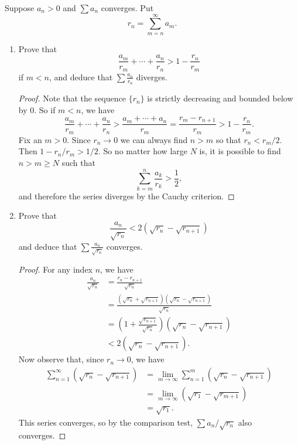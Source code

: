  Suppose $a_n > 0$ and $\sum a_n$ converges. Put
\begin{equation*}
  r_n = \sum_{m=n}^\infty a_m.
\end{equation*}
\begin{enumerate}
\item Prove that
  \begin{equation*}
    \frac{a_m}{r_m} + \cdots + \frac{a_n}{r_n} > 1 - \frac{r_n}{r_m}
  \end{equation*}
  if $m < n$, and deduce that $\sum\frac{a_n}{r_n}$ diverges.
  \begin{proof}
    Note that the sequence $\{r_n\}$ is strictly decreasing and
    bounded below by $0$. So if $m < n$, we have
    \begin{equation*}
      \frac{a_m}{r_m} + \cdots + \frac{a_n}{r_n}
      > \frac{a_m + \cdots + a_n}{r_m}
      = \frac{r_m - r_{n+1}}{r_m} > 1 - \frac{r_n}{r_m}.
    \end{equation*}
    Fix an $m > 0$. Since $r_n\to0$ we can always find $n > m$ so that
    $r_n < r_m/2$. Then $1 - r_n/r_m > 1/2$. So no matter how large
    $N$ is, it is possible to find $n>m\geq N$ such that
    \begin{equation*}
      \sum_{k=m}^n\frac{a_k}{r_k} > \frac12,
    \end{equation*}
    and therefore the series diverges by the Cauchy criterion.
  \end{proof}
\item Prove that
  \begin{equation*}
    \frac{a_n}{\sqrt{r_n}} < 2(\sqrt{r_n} - \sqrt{r_{n+1}})
  \end{equation*}
  and deduce that $\sum\frac{a_n}{\sqrt{r_n}}$ converges.
  \begin{proof}
    For any index $n$, we have
    \begin{align*}
      \frac{a_n}{\sqrt{r_n}}
      &= \frac{r_n - r_{n+1}}{\sqrt{r_n}} \\
      &= \frac{(\sqrt{r_n} + \sqrt{r_{n+1}})
        (\sqrt{r_n} - \sqrt{r_{n+1}})}{\sqrt{r_n}} \\
      &= \left(1 + \frac{\sqrt{r_{n+1}}}{\sqrt{r_n}}\right)
        (\sqrt{r_n} - \sqrt{r_{n+1}}) \\
      &< 2(\sqrt{r_n} - \sqrt{r_{n+1}}).
    \end{align*}
    Now observe that, since $r_n\to0$, we have
    \begin{align*}
      \sum_{n=1}^\infty(\sqrt{r_n} - \sqrt{r_{n+1}})
      &= \lim_{m\to\infty}\sum_{n=1}^m(\sqrt{r_n} - \sqrt{r_{n+1}}) \\
      &= \lim_{m\to\infty}(\sqrt{r_1} - \sqrt{r_{m+1}}) \\
      &= \sqrt{r_1}.
    \end{align*}
    This series converges, so by the comparison test,
    $\sum a_n/\sqrt{r_n}$ also converges.
  \end{proof}
\end{enumerate}


